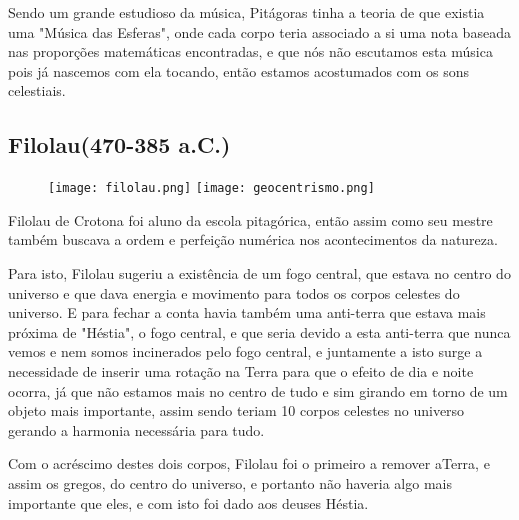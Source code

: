 Sendo um grande estudioso da música, Pitágoras tinha a teoria de que existia uma "Música das Esferas", onde cada corpo teria associado a si uma nota baseada nas proporções matemáticas encontradas, e que nós não escutamos esta música pois já nascemos com ela tocando, então estamos acostumados com os sons celestiais.

\subsection*{Filolau(470-385 a.C.)}
\begin{figure}[!htb]
	\centering
	\texttt{[image: filolau.png]}
	\texttt{[image: geocentrismo.png]}
\end{figure}

Filolau de Crotona foi aluno da escola pitagórica, então assim como seu mestre também buscava a ordem e perfeição numérica nos acontecimentos da natureza.

Para isto, Filolau sugeriu a existência de um fogo central, que estava no centro do universo e que dava energia e movimento para todos os corpos celestes do universo. E para fechar a conta havia também uma anti-terra que estava mais próxima de "Héstia", o fogo central, e que seria devido a esta anti-terra que nunca vemos e nem somos incinerados pelo fogo central, e juntamente a isto surge a necessidade de inserir uma rotação na Terra para que o efeito de dia e noite ocorra, já que não estamos mais no centro de tudo e sim girando em torno de um objeto mais importante, assim sendo teriam 10 corpos celestes no universo gerando a harmonia necessária para tudo.

Com o acréscimo destes dois corpos, Filolau foi o primeiro a remover aTerra, e assim os gregos, do centro do universo, e portanto não haveria algo mais importante que eles, e com isto foi dado aos deuses Héstia.







